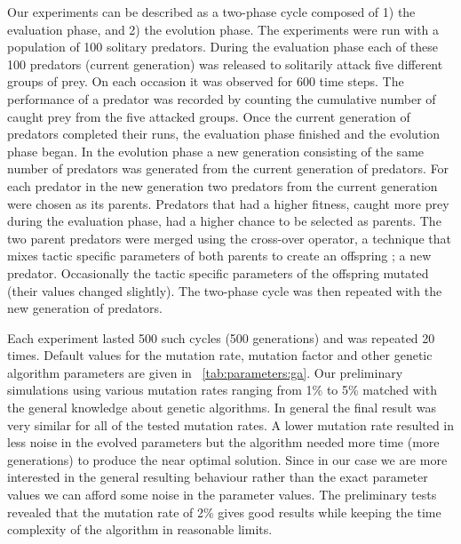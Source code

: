 Our experiments can be described as a two-phase cycle composed of 1) the evaluation phase, and 2) the evolution phase. The experiments were run with a population of 100 solitary predators. During the evaluation phase each of these 100 predators (current generation) was released to solitarily attack five different groups of prey. On each occasion it was observed for 600 time steps. The performance of a predator was recorded by counting the cumulative number of caught prey from the five attacked groups. Once the current generation of predators completed their runs, the evaluation phase finished and the evolution phase began. In the evolution phase a new generation consisting of the same number of predators was generated from the current generation of predators. For each predator in the new generation two predators from the current generation were chosen as its parents. Predators that had a higher fitness, \ie caught more prey during the evaluation phase, had a higher chance to be selected as parents. The two parent predators were merged using the cross-over operator, a technique that mixes tactic specific parameters of both parents to create an offspring \cite{holland1992adaptation}; a new predator. Occasionally the tactic specific parameters of the offspring mutated (their values changed slightly). The two-phase cycle was then repeated with the new generation of predators.

Each experiment lasted 500 such cycles (500 generations) and was repeated 20 times. Default values for the mutation rate, mutation factor and other genetic algorithm parameters are given in \tablename~\ref{tab:parameters:ga}. Our preliminary simulations using various mutation rates ranging from 1\% to 5\% matched with the general knowledge about genetic algorithms. In general the final result was very similar for all of the tested mutation rates. A lower mutation rate resulted in less noise in the evolved parameters but the algorithm needed more time (more generations) to produce the near optimal solution. Since in our case we are more interested in the general resulting behaviour rather than the exact parameter values we can afford some noise in the parameter values. The preliminary tests revealed that the mutation rate of 2\% gives good results while keeping the time complexity of the algorithm in reasonable limits.

